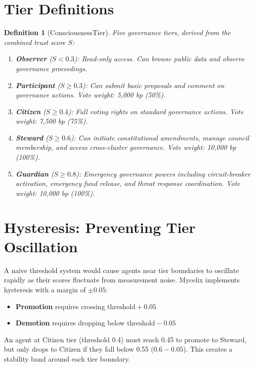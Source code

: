 \documentclass[12pt]{book}
\newtheorem{definition}{Definition}[chapter]
\begin{document}
\section{Tier Definitions}

\begin{definition}[ConsciousnessTier]
Five governance tiers, derived from the combined trust score $S$:
\begin{enumerate}
  \item \textbf{Observer} ($S < 0.3$): Read-only access. Can browse public data
    and observe governance proceedings.
  \item \textbf{Participant} ($S \geq 0.3$): Can submit basic proposals and
    comment on governance actions. Vote weight: 5,000 bp (50\%).
  \item \textbf{Citizen} ($S \geq 0.4$): Full voting rights on standard
    governance actions. Vote weight: 7,500 bp (75\%).
  \item \textbf{Steward} ($S \geq 0.6$): Can initiate constitutional amendments,
    manage council membership, and access cross-cluster governance. Vote weight:
    10,000 bp (100\%).
  \item \textbf{Guardian} ($S \geq 0.8$): Emergency governance powers including
    circuit-breaker activation, emergency fund release, and threat response
    coordination. Vote weight: 10,000 bp (100\%).
\end{enumerate}
\end{definition}

\section{Hysteresis: Preventing Tier Oscillation}

A naive threshold system would cause agents near tier boundaries to oscillate
rapidly as their scores fluctuate from measurement noise. Mycelix implements
hysteresis with a margin of $\pm 0.05$:

\begin{itemize}
  \item \textbf{Promotion} requires crossing $\text{threshold} + 0.05$
  \item \textbf{Demotion} requires dropping below $\text{threshold} - 0.05$
\end{itemize}

An agent at Citizen tier (threshold 0.4) must reach 0.45 to promote to Steward,
but only drops to Citizen if they fall below 0.55 ($0.6 - 0.05$). This creates
a stability band around each tier boundary.
\end{document}
